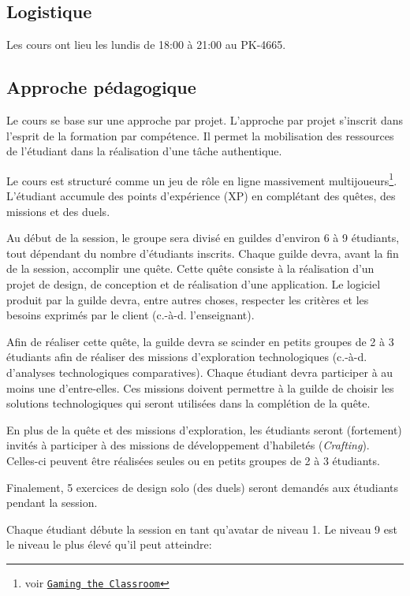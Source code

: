 \documentclass{article}
\newcommand{\ie} {c.-à-d. }
\begin{document}
\subsection{Logistique}
\label{sub:logistique}

Les cours ont lieu les lundis de 18:00 à 21:00 au PK-4665. 

\subsection{Approche pédagogique}
\label{sub:approche_pedagogique}

Le cours se base sur une approche par projet. L'approche par projet s'inscrit dans l'esprit de la formation par compétence. Il permet la mobilisation des ressources de l'étudiant dans la réalisation d'une tâche authentique.

Le cours est structuré comme un jeu de rôle en ligne massivement multijoueurs\footnote{voir \href{http://gamingtheclassroom.wordpress.com/}{\texttt{Gaming the Classroom}}}. L'étudiant accumule des points d'expérience (XP) en complétant des quêtes, des missions et des duels.

Au début de la session, le groupe sera divisé en guildes d'environ 6 à 9 étudiants, tout dépendant du nombre d'étudiants inscrits. Chaque guilde devra, avant la fin de la session, accomplir une quête. Cette quête consiste à la réalisation d'un projet de design, de conception et de réalisation d'une application. Le logiciel produit par la guilde devra, entre autres choses, respecter les critères et les besoins exprimés par le client (\ie l'enseignant).

Afin de réaliser cette quête, la guilde devra se scinder en petits groupes de 2 à 3 étudiants afin de réaliser des missions d'exploration technologiques (\ie d'analyses technologiques comparatives). Chaque étudiant devra participer à au moins une d'entre-elles. Ces missions doivent permettre à la guilde de choisir les solutions technologiques qui seront utilisées dans la complétion de la quête.

En plus de la quête et des missions d'exploration, les étudiants seront (fortement) invités à participer à des missions de développement d'habiletés (\emph{Crafting}). Celles-ci peuvent être réalisées seules ou en petits groupes de 2 à 3 étudiants.

Finalement, 5 exercices de design solo (des duels) seront demandés aux étudiants pendant la session.

Chaque étudiant débute la session en tant qu'avatar de niveau 1. Le niveau 9 est le niveau le plus élevé qu'il peut atteindre:
\end{document}
